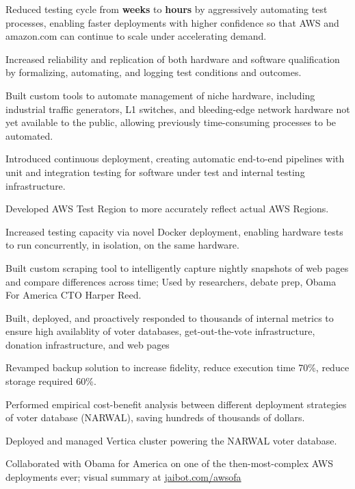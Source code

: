 \documentclass[]{resume}
\begin{document}
\begin{minipage}[t]{0.66\textwidth}
\begin{tightemize}
\item Reduced testing cycle from \textbf{weeks} to \textbf{hours} by aggressively automating test processes, enabling faster deployments with higher confidence so that AWS and amazon.com can continue to scale under accelerating demand.
\item Increased reliability and replication of both hardware and software qualification by formalizing, automating, and logging test conditions and outcomes.
\item Built custom tools to automate management of niche hardware, including industrial traffic generators, L1 switches, and bleeding-edge network hardware not yet available to the public, allowing previously time-consuming processes to be automated.
\item Introduced continuous deployment, creating automatic end-to-end pipelines with unit and integration testing for software under test and internal testing infrastructure.
\item Developed AWS Test Region to more accurately reflect actual AWS Regions.
\item Increased testing capacity via novel Docker deployment, enabling hardware tests to run concurrently, in isolation, on the same hardware.
\end{tightemize}
\sectionsep

\descript{}
\begin{tightemize}
\item Built custom scraping tool to intelligently capture nightly snapshots of web pages and compare differences across time; Used by researchers, debate prep, Obama For America CTO Harper Reed.
\item Built, deployed, and proactively responded to thousands of internal metrics to ensure high availablity of voter databases, get-out-the-vote infrastructure, donation infrastructure, and web pages
\item Revamped backup solution to increase fidelity, reduce execution time 70\%, reduce storage required 60\%.
\item Performed empirical cost-benefit analysis between different deployment strategies of voter database (NARWAL), saving hundreds of thousands of dollars.
\item Deployed and managed Vertica cluster powering the NARWAL voter database.
\item Collaborated with Obama for America on one of the then-most-complex AWS deployments ever; visual summary at \href{http://www.jaibot.com/awsofa}{jaibot.com/awsofa}
\end{tightemize}
\sectionsep


\end{minipage}
\end{document}
